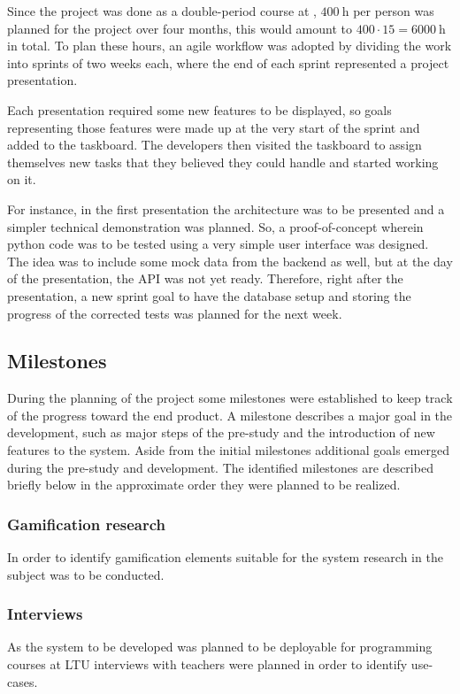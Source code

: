 Since the project was done as a double-period course at \LTU, $\SI{400}{\hour}$ per person was planned for the project over four months, this would amount to $400\cdot15=\SI{6000}{\hour}$ in total. To plan these hours, an agile workflow was adopted by dividing the work into sprints of two weeks each, where the end of each sprint represented a project presentation.

Each presentation required some new features to be displayed, so goals representing those features were made up at the very start of the sprint and added to the taskboard. The developers then visited the taskboard to assign themselves new tasks that they believed they could handle and started working on it.

For instance, in the first presentation the architecture was to be presented and a simpler technical demonstration was planned. So, a proof-of-concept wherein python code was to be tested using a very simple user interface was designed. The idea was to include some mock data from the backend as well, but at the day of the presentation, the API was not yet ready. Therefore, right after the presentation, a new sprint goal to have the database setup and storing the progress of the corrected tests was planned for the next week.

\subsection{Milestones}
During the planning of the project some milestones were established to keep track of the progress toward the end product. A milestone describes a major goal in the development, such as major steps of the pre-study and the introduction of new features to the system. Aside from the initial milestones additional goals emerged during the pre-study and development. The identified milestones are described briefly below in the approximate order they were planned to be realized.

\subsubsection{Gamification research}
In order to identify gamification elements suitable for the system research in the subject was to be conducted.

\subsubsection{Interviews}
As the system to be developed was planned to be deployable for programming courses at LTU interviews with teachers were planned in order to identify use-cases.

